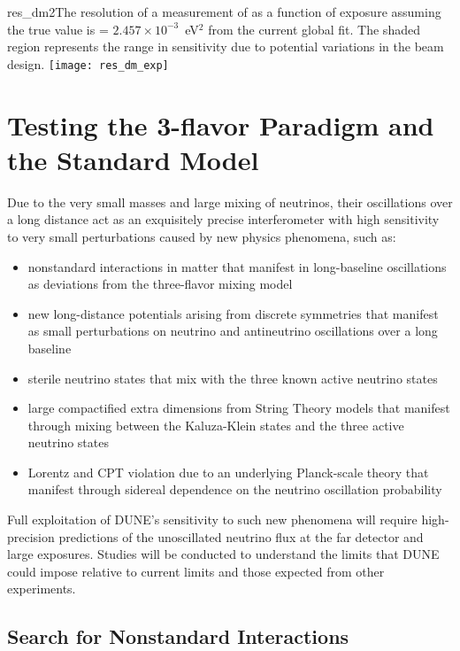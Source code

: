 \begin{cdrfigure}{res_dm2}{The resolution of a measurement of  as a function of exposure assuming the true value is  = $2.457\times10^{-3}$~eV$^2$ from the current global fit. The shaded region represents the range in sensitivity due to potential variations in the beam design.  }
 \texttt{[image: res\_dm\_exp]}
\end{cdrfigure}

\section{Testing the 3-flavor Paradigm and the Standard Model}
\label{sec:physics-lbnosc-3nutests}

Due to the very small masses and large mixing of neutrinos, their oscillations over a long distance
  act as an exquisitely precise interferometer with high sensitivity to very small perturbations caused by 
  new physics phenomena, such as:
  \begin{itemize}
  \item nonstandard interactions in matter that manifest in
    long-baseline oscillations as deviations from the three-flavor mixing model
  \item new long-distance potentials arising from discrete symmetries
    that manifest as small perturbations on neutrino and antineutrino
    oscillations over a long baseline
  \item sterile neutrino states that mix with the three known active neutrino states
  \item large compactified extra dimensions from String Theory models that manifest through mixing
    between the Kaluza-Klein states and the three active neutrino
    states
   \item Lorentz and CPT violation due to an underlying Planck-scale theory that manifest through sidereal dependence on the neutrino oscillation probability
  \end{itemize}
  Full exploitation of DUNE's sensitivity to such new phenomena
  will require high-precision predictions of the unoscillated
  neutrino flux at the far detector and large exposures. Studies will be conducted to understand the
limits that DUNE could impose relative to current limits and those expected from other experiments.
  
\subsection{Search for Nonstandard Interactions}

